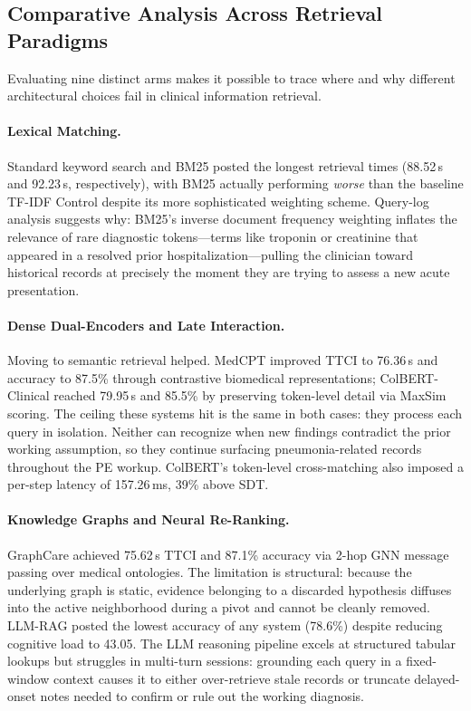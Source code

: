 \documentclass[10pt, onecolumn]{article}
\begin{document}
\subsection{Comparative Analysis Across Retrieval Paradigms}

Evaluating nine distinct arms makes it possible to trace where and why different architectural choices fail in clinical information retrieval.

\paragraph{Lexical Matching.}
Standard keyword search and BM25 posted the longest retrieval times (88.52\,s and 92.23\,s, respectively), with BM25 actually performing \emph{worse} than the baseline TF-IDF Control despite its more sophisticated weighting scheme. Query-log analysis suggests why: BM25's inverse document frequency weighting inflates the relevance of rare diagnostic tokens---terms like troponin or creatinine that appeared in a resolved prior hospitalization---pulling the clinician toward historical records at precisely the moment they are trying to assess a new acute presentation.

\paragraph{Dense Dual-Encoders and Late Interaction.}
Moving to semantic retrieval helped. MedCPT \cite{jin2023medcpt} improved TTCI to 76.36\,s and accuracy to 87.5\% through contrastive biomedical representations; ColBERT-Clinical \cite{santhanam2022colbertv2} reached 79.95\,s and 85.5\% by preserving token-level detail via MaxSim scoring. The ceiling these systems hit is the same in both cases: they process each query in isolation. Neither can recognize when new findings contradict the prior working assumption, so they continue surfacing pneumonia-related records throughout the PE workup. ColBERT's token-level cross-matching also imposed a per-step latency of 157.26\,ms, 39\% above SDT.

\paragraph{Knowledge Graphs and Neural Re-Ranking.}
GraphCare \cite{jiang2024graphcare} achieved 75.62\,s TTCI and 87.1\% accuracy via 2-hop GNN message passing over medical ontologies. The limitation is structural: because the underlying graph is static, evidence belonging to a discarded hypothesis diffuses into the active neighborhood during a pivot and cannot be cleanly removed. LLM-RAG \cite{eickhoff2024ehrrag,zakka2024almanac} posted the lowest accuracy of any system (78.6\%) despite reducing cognitive load to 43.05. The LLM reasoning pipeline excels at structured tabular lookups but struggles in multi-turn sessions: grounding each query in a fixed-window context causes it to either over-retrieve stale records or truncate delayed-onset notes needed to confirm or rule out the working diagnosis.
\end{document}
